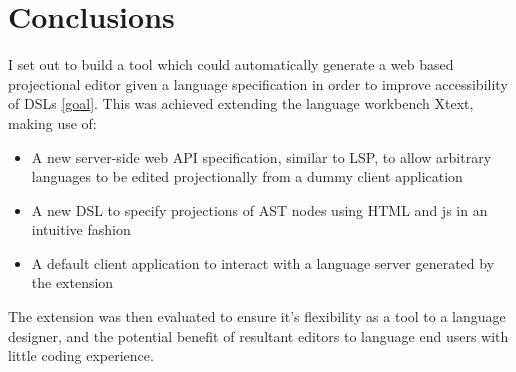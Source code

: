 \documentclass{article}
\begin{document}
{\section{Conclusions}\label{conclusion}
I set out to build a tool which could automatically generate a web based projectional editor given a language specification in order to improve accessibility of DSLs \ref{goal}. This was achieved extending the language workbench Xtext, making use of:
\begin{itemize}
\item{A new server-side web API specification, similar to LSP, to allow arbitrary languages to be edited projectionally from a dummy client application}
\item{A new DSL to specify projections of AST nodes using HTML and js in an intuitive fashion}
\item{A default client application to interact with a language server generated by the extension}
\end{itemize}
The extension was then evaluated to ensure it's flexibility as a tool to a language designer, and the potential benefit of resultant editors to language end users with little coding experience.

}
\end{document}
